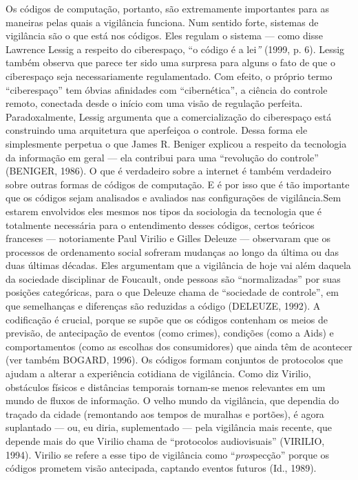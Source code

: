 Os códigos de computação, portanto, são extremamente importantes para as
maneiras pelas quais a vigilância funciona. Num sentido forte, sistemas
de vigilância são o que está nos códigos. Eles regulam o sistema ---
como disse Lawrence Lessig a respeito do ciberespaço, ``o código é a
lei\emph{''} (1999, p. 6). Lessig também observa que parece ter sido uma
surpresa para alguns o fato de que o ciberespaço seja necessariamente
regulamentado. Com efeito, o próprio termo ``ciberespaço'' tem óbvias
afinidades com ``cibernética'', a ciência do controle remoto, conectada
desde o início com uma visão de regulação perfeita. Paradoxalmente,
Lessig argumenta que a comercialização do ciberespaço está construindo
uma arquitetura que aperfeiçoa o controle. Dessa forma ele simplesmente
perpetua o que James R. Beniger explicou a respeito da tecnologia da
informação em geral --- ela contribui para uma ``revolução do controle''
(BENIGER, 1986). O que é verdadeiro sobre a internet é também verdadeiro
sobre outras formas de códigos de computação. E é por isso que é tão
importante que os códigos sejam analisados e avaliados nas configurações
de vigilância.Sem estarem envolvidos eles mesmos nos tipos da sociologia
da tecnologia que é totalmente necessária para o entendimento desses
códigos, certos teóricos franceses --- notoriamente Paul Virilio e
Gilles Deleuze --- observaram que os processos de ordenamento social
sofreram mudanças ao longo da última ou das duas últimas décadas. Eles
argumentam que a vigilância de hoje vai além daquela da sociedade
disciplinar de Foucault, onde pessoas são ``normalizadas'' por suas
posições categóricas, para o que Deleuze chama de ``sociedade de
controle'', em que semelhanças e diferenças são reduzidas a código
(DELEUZE, 1992). A codificação é crucial, porque se supõe que os códigos
contenham os meios de previsão, de antecipação de eventos (como crimes),
condições (como a Aids) e comportamentos (como as escolhas dos
consumidores) que ainda têm de acontecer (ver também BOGARD, 1996). Os
códigos formam conjuntos de protocolos que ajudam a alterar a
experiência cotidiana de vigilância. Como diz Virilio, obstáculos
físicos e distâncias temporais tornam-se menos relevantes em um mundo de
fluxos de informação. O velho mundo da vigilância, que dependia do
traçado da cidade (remontando aos tempos de muralhas e portões), é agora
suplantado --- ou, eu diria, suplementado --- pela vigilância mais
recente, que depende mais do que Virilio chama de ``protocolos
audiovisuais'' (VIRILIO, 1994). Virilio se refere a esse tipo de
vigilância como ``\emph{pros}pecção'' porque os códigos prometem visão
antecipada, captando eventos futuros (Id., 1989).

